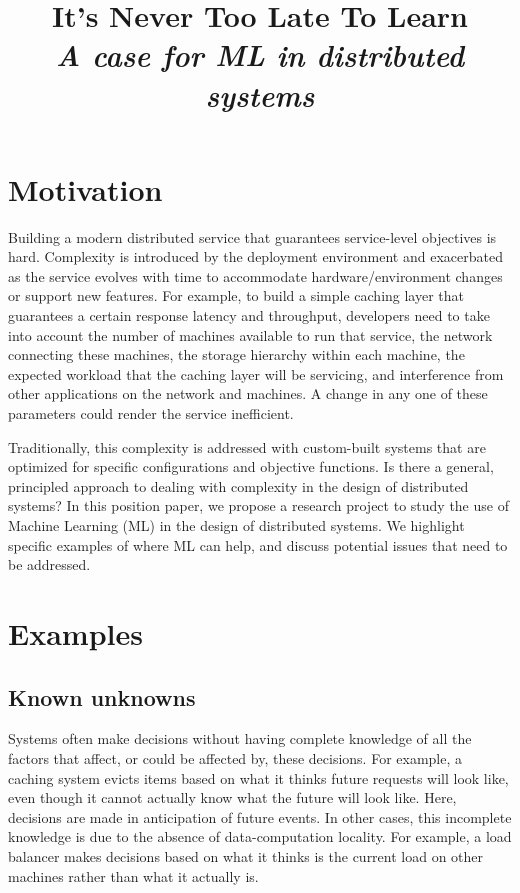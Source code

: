\documentclass[a4paper,twocolumn]{article}
\title{
  It's Never Too Late To Learn\\
  \emph{A case for ML in distributed systems}
}
\author{}
\date{}
\begin{document}
\maketitle

\section{Motivation}

Building a modern distributed service that guarantees service-level objectives
is hard. Complexity is introduced by the deployment environment and exacerbated
as the service evolves with time to accommodate hardware/environment changes or
support new features.
For example, to build a simple caching layer that guarantees a certain response
latency and throughput, developers need to take into account the number of
machines available to run that service, the network connecting these machines,
the storage hierarchy within each machine, the expected workload that the
caching layer will be servicing, and interference from other applications on the network and machines.
A change in any one of these parameters could render the service inefficient.

Traditionally, this complexity is addressed with custom-built systems that
are optimized for specific configurations and objective functions. Is there a
general, principled approach to dealing with complexity in the design of
distributed systems?
In this position paper, we propose a research project to study the use of
Machine Learning (ML) in the design of distributed systems. We highlight
specific examples of where ML can help, and discuss potential issues that need
to be addressed.


\section{Examples}

\subsection{Known unknowns}
Systems often make decisions without having complete knowledge of all the
factors that affect, or could be affected by, these decisions.  For example, a
caching system evicts items based on what it thinks future requests will look
like, even though it cannot actually know what the future will look like. Here,
decisions are made in anticipation of future events.  In other cases, this
incomplete knowledge is due to the absence of data-computation locality. For
example, a load balancer makes decisions based on what it thinks is the current
load on other machines rather than what it actually is.
\end{document}
